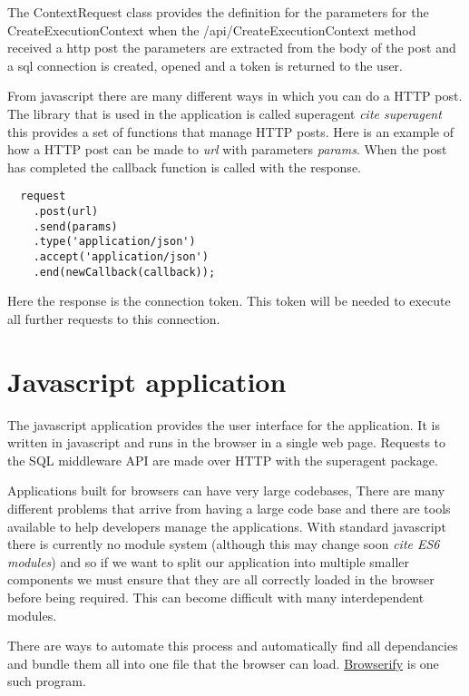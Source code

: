 The ContextRequest class provides the definition for the parameters for
the CreateExecutionContext when the /api/CreateExecutionContext method
received a http post the parameters are extracted from the body of the
post and a sql connection is created, opened and a token is returned to
the user.

From javascript there are many different ways in which you can do a HTTP
post. The library that is used in the application is called superagent
\emph{cite superagent} this provides a set of functions that manage HTTP
posts. Here is an example of how a HTTP post can be made to \emph{url}
with parameters \emph{params}. When the post has completed the callback
function is called with the response.

\begin{verbatim}
  request
    .post(url)
    .send(params)
    .type('application/json')
    .accept('application/json')
    .end(newCallback(callback));
\end{verbatim}

Here the response is the connection token. This token will be needed to
execute all further requests to this connection.

\section{Javascript application}\label{javascript-application}

The javascript application provides the user interface for the
application. It is written in javascript and runs in the browser in a
single web page. Requests to the SQL middleware API are made over HTTP
with the superagent package.

Applications built for browsers can have very large codebases, There are
many different problems that arrive from having a large code base and
there are tools available to help developers manage the applications.
With standard javascript there is currently no module system (although
this may change soon \emph{cite ES6 modules}) and so if we want to split
our application into multiple smaller components we must ensure that
they are all correctly loaded in the browser before being required. This
can become difficult with many interdependent modules.

There are ways to automate this process and automatically find all
dependancies and bundle them all into one file that the browser can
load. \href{http://browserify.org/}{Browserify} is one such program.

